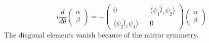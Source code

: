 \documentclass{article}
\begin{document}
\begin{equation}
   i\frac{d}{d\theta}
                          \begin{pmatrix}
                            \alpha \\
                            \beta
                          \end{pmatrix}
                         = - \begin{pmatrix}
                            0 &&
                            \langle \psi_1 \hat{l}_z \psi_2\rangle\\
                            \langle \psi_2 \hat{l}_z \psi_1\rangle &&
                            0
                          \end{pmatrix}
                          \begin{pmatrix}
                            \alpha \\
                            \beta
                          \end{pmatrix}
\end{equation}
The diagonal elements vanish because of the mirror symmetry.
\end{document}
